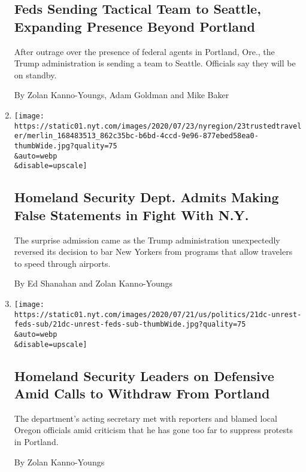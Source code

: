 \begin{enumerate}
  \hypertarget{feds-sending-tactical-team-to-seattle-expanding-presence-beyond-portland}{%
  \subsection{Feds Sending Tactical Team to Seattle, Expanding Presence
  Beyond
  Portland}\label{feds-sending-tactical-team-to-seattle-expanding-presence-beyond-portland}}

  After outrage over the presence of federal agents in Portland, Ore.,
  the Trump administration is sending a team to Seattle. Officials say
  they will be on standby.

  By Zolan Kanno-Youngs, Adam Goldman and Mike Baker
\item
  \href{/2020/07/23/nyregion/trusted-traveler-homeland-security.html}{}

  \texttt{[image: https://static01.nyt.com/images/2020/07/23/nyregion/23trustedtraveler/merlin\_168483513\_862c35bc-b6bd-4ccd-9e96-877ebed58ea0-thumbWide.jpg?quality=75\\\&auto=webp\\\&disable=upscale]}

  \hypertarget{homeland-security-dept-admits-making-false-statements-in-fight-with-ny}{%
  \subsection{Homeland Security Dept. Admits Making False Statements in
  Fight With
  N.Y.}\label{homeland-security-dept-admits-making-false-statements-in-fight-with-ny}}

  The surprise admission came as the Trump administration unexpectedly
  reversed its decision to bar New Yorkers from programs that allow
  travelers to speed through airports.

  By Ed Shanahan and Zolan Kanno-Youngs
\item
  \href{/2020/07/21/us/politics/homeland-security-portland-oregon.html}{}

  \texttt{[image: https://static01.nyt.com/images/2020/07/21/us/politics/21dc-unrest-feds-sub/21dc-unrest-feds-sub-thumbWide.jpg?quality=75\\\&auto=webp\\\&disable=upscale]}

  \hypertarget{homeland-security-leaders-on-defensive-amid-calls-to-withdraw-from-portland}{%
  \subsection{Homeland Security Leaders on Defensive Amid Calls to
  Withdraw From
  Portland}\label{homeland-security-leaders-on-defensive-amid-calls-to-withdraw-from-portland}}

  The department's acting secretary met with reporters and blamed local
  Oregon officials amid criticism that he has gone too far to suppress
  protests in Portland.

  By Zolan Kanno-Youngs
\end{enumerate}


